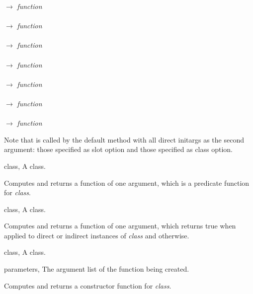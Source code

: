 \begin{optDefinition}
\begin{table}
\begin{tabbing}
    \>\>\>\>
    $\rightarrow$ {\em function}\\
    \\
    \>\>\>\>
    $\rightarrow$ {\em function}\\
    \>\\
    \>\>\>\>\>
    $\rightarrow$ {\em function}\\
    \>\>\\
    \>\>\>\>\>\>
    $\rightarrow$ {\em function}\\
    \\
    \>\>\>\>
    $\rightarrow$ {\em function}\\
    \>\\
    \>\>\>\>\>
    $\rightarrow$ {\em function}\\
    \>\>\\
    \>\>\>\>\>\>
    $\rightarrow$ {\em function}%
\end{tabbing}%
\end{table}%
%
Note that  is called by the default
 method with all direct initargs as the second argument:
those specified as slot option and those specified as class option.

%
\begin{genericargs}
    \item[class, \classref{class}] A class.
\end{genericargs}
%
\result%
Computes and returns a function of one argument, which is a predicate
function for {\em class}.

%
\begin{specargs}
    \item[class, \classref{class}] A class.
\end{specargs}
%
\result%
Computes and returns a function of one argument, which returns true when applied
to direct or indirect instances of {\em class} and \nil{}\/ otherwise.

%
\begin{genericargs}
    \item[class, \classref{class}] A class.
    \item[parameters, \classref{list}] The argument list of the function being
    created.
\end{genericargs}
%
\result%
Computes and returns a constructor function for {\em class}.


\end{optDefinition}
